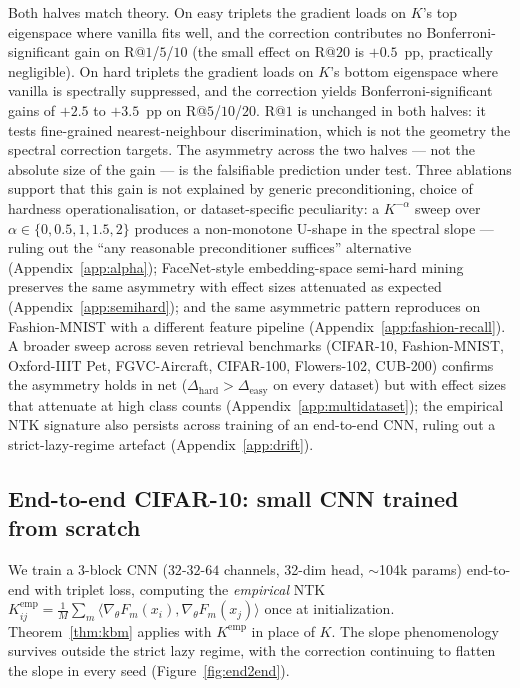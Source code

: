 \documentclass{article}
\begin{document}
Both halves match theory. On easy triplets the gradient loads on $K$'s
top eigenspace where vanilla fits well, and the correction contributes
no Bonferroni-significant gain on R@$1$/$5$/$10$ (the small effect on
R@$20$ is $+0.5$~pp, practically negligible). On hard triplets the
gradient loads on $K$'s bottom eigenspace where vanilla is spectrally
suppressed, and the correction yields Bonferroni-significant gains of
$+2.5$ to $+3.5$~pp on R@$5$/$10$/$20$. R@$1$ is unchanged in both
halves: it tests fine-grained nearest-neighbour discrimination, which is
not the geometry the spectral correction targets. The asymmetry across
the two halves --- not the absolute size of the gain --- is the
falsifiable prediction under test. Three ablations support that this gain is not explained by generic
preconditioning, choice of hardness operationalisation, or
dataset-specific peculiarity: a $K^{-\alpha}$ sweep over
$\alpha \in \{0, 0.5, 1, 1.5, 2\}$ produces a non-monotone U-shape in
the spectral slope --- ruling out the ``any reasonable preconditioner
suffices'' alternative (Appendix~\ref{app:alpha}); FaceNet-style
embedding-space semi-hard mining preserves the same asymmetry with
effect sizes attenuated as expected (Appendix~\ref{app:semihard}); and
the same asymmetric pattern reproduces on Fashion-MNIST with a different
feature pipeline (Appendix~\ref{app:fashion-recall}). A broader sweep
across seven retrieval benchmarks (CIFAR-10, Fashion-MNIST, Oxford-IIIT
Pet, FGVC-Aircraft, CIFAR-100, Flowers-102, CUB-200) confirms the
asymmetry holds in net ($\Delta_{\text{hard}} > \Delta_{\text{easy}}$
on every dataset) but with effect sizes that attenuate at high class
counts (Appendix~\ref{app:multidataset}); the empirical NTK signature
also persists across training of an end-to-end CNN, ruling out a
strict-lazy-regime artefact (Appendix~\ref{app:drift}).

\subsection{End-to-end CIFAR-10: small CNN trained from scratch}
\label{sec:exp-end2end}

We train a 3-block CNN ($32$-$32$-$64$ channels, 32-dim head,
$\sim$104k params) end-to-end with triplet loss, computing the
\emph{empirical} NTK
$K^{\mathrm{emp}}_{ij} = \frac{1}{M}\sum_m \langle \nabla_\theta F_m(x_i), \nabla_\theta F_m(x_j)\rangle$
once at initialization.
Theorem~\ref{thm:kbm} applies with $K^{\mathrm{emp}}$ in place of $K$.
The slope phenomenology survives outside the strict lazy regime, with
the correction continuing to flatten the slope in every seed
(Figure~\ref{fig:end2end}).
\end{document}
